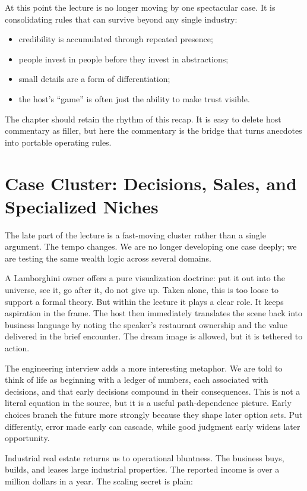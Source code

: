 At this point the lecture is no longer moving by one spectacular case. It is consolidating rules that can survive beyond any single industry:
\begin{itemize}
\item credibility is accumulated through repeated presence;
\item people invest in people before they invest in abstractions;
\item small details are a form of differentiation;
\item the host's ``game'' is often just the ability to make trust visible.
\end{itemize}

The chapter should retain the rhythm of this recap. It is easy to delete host commentary as filler, but here the commentary is the bridge that turns anecdotes into portable operating rules.

\section{Case Cluster: Decisions, Sales, and Specialized Niches}

The late part of the lecture is a fast-moving cluster rather than a single argument. The tempo changes. We are no longer developing one case deeply; we are testing the same wealth logic across several domains.

A Lamborghini owner offers a pure visualization doctrine: put it out into the universe, see it, go after it, do not give up. Taken alone, this is too loose to support a formal theory. But within the lecture it plays a clear role. It keeps aspiration in the frame. The host then immediately translates the scene back into business language by noting the speaker's restaurant ownership and the value delivered in the brief encounter. The dream image is allowed, but it is tethered to action.

The engineering interview adds a more interesting metaphor. We are told to think of life as beginning with a ledger of numbers, each associated with decisions, and that early decisions compound in their consequences. This is not a literal equation in the source, but it is a useful path-dependence picture. Early choices branch the future more strongly because they shape later option sets. Put differently, error made early can cascade, while good judgment early widens later opportunity.

Industrial real estate returns us to operational bluntness. The business buys, builds, and leases large industrial properties. The reported income is over a million dollars in a year. The scaling secret is plain:

